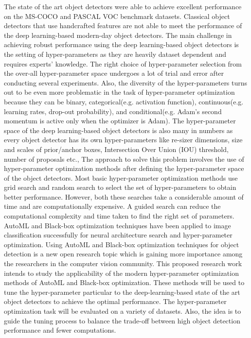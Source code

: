 \documentclass[thesis]{mas_proposal}
\begin{document}
 The state of the art object detectors were able to achieve excellent performance on the MS-COCO\cite{lin2014microsoft} and PASCAL VOC\cite{Everingham10} benchmark datasets. Classical object detectors that use handcrafted features are not able to meet the performance of the deep learning-based modern-day object detectors\cite{zou2019object}. The main challenge in achieving robust performance using the deep learning-based object detectors is the setting of hyper-parameters as they are heavily dataset dependent and requires experts' knowledge. The right choice of hyper-parameter selection from the over-all hyper-parameter space undergoes a lot of trial and error after conducting several experiments. Also, the diversity of the hyper-parameters turns out to be even more problematic in the task of hyper-parameter optimization because they can be binary, categorical(e.g. activation function), continuous(e.g. learning rates, drop-out probability),  and conditional(e.g. Adam's second momentum is active only when the optimizer is Adam)\cite{automl_book}.  The hyper-parameter space of the deep learning-based object detectors is also many in numbers as every object detector has its own hyper-parameters like re-sizer dimensions, size and scales of prior/anchor boxes, Intersection Over Union (IOU) threshold, number of proposals etc., The approach to solve this problem involves the use of hyper-parameter optimization methods after defining the hyper-parameter space of the object detectors. Most basic hyper-parameter optimization methods use grid search\cite{montgomery2001design} and random search\cite{bergstra2012random} to select the set of hyper-parameters to obtain better performance. However, both these searches take a considerable amount of time and are computationally expensive. A guided search can reduce the computational complexity and time taken to find the right set of parameters. 
AutoML and Black-box optimization techniques have been applied to image classification successfully for neural architecture search and hyper-parameter optimization. Using AutoML and Black-box optimization techniques for object detection is a new open research topic which is gaining more importance among the researchers in the computer vision community. This proposed research work intends to study the applicability of the modern hyper-parameter optimization methods of AutoML and Black-box optimization. These methods will be used to tune the hyper-parameter particular to the deep-learning-based state of the art object detectors to achieve the optimal performance.  The hyper-parameter optimization task will be evaluated on a variety of datasets. Also, the idea is to guide the tuning process to balance the trade-off between high object detection performance and fewer computations.
\end{document}
